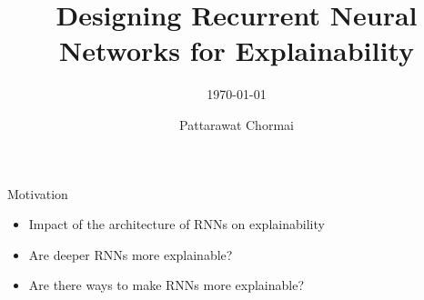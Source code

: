 \documentclass[Nike]{tuberlinbeamer}
\title{Designing Recurrent Neural Networks for Explainability}
\subtitle{\today}
\author[@Someplace]{Pattarawat Chormai}
\institute{Technische Universität Berlin}
\begin{document}
\begin{frame}
\maketitle
\end{frame}




\begin{frame}{Motivation}

\begin{itemize}
	\item Impact of the architecture of RNNs on explainability
	\item Are deeper RNNs more explainable? 
	\item Are there ways to make RNNs more explainable?
\end{itemize}
\end{frame}
\end{document}
